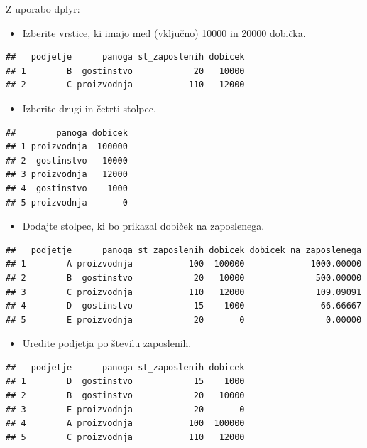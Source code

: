 \documentclass[
]{book}
\providecommand{\tightlist}{%
  \setlength{\itemsep}{0pt}\setlength{\parskip}{0pt}}
\begin{document}
Z uporabo dplyr:

\begin{itemize}
\tightlist
\item
  Izberite vrstice, ki imajo med (vključno) 10000 in 20000 dobička.
\end{itemize}

\begin{verbatim}
##   podjetje      panoga st_zaposlenih dobicek
## 1        B  gostinstvo            20   10000
## 2        C proizvodnja           110   12000
\end{verbatim}

\begin{itemize}
\tightlist
\item
  Izberite drugi in četrti stolpec.
\end{itemize}

\begin{verbatim}
##        panoga dobicek
## 1 proizvodnja  100000
## 2  gostinstvo   10000
## 3 proizvodnja   12000
## 4  gostinstvo    1000
## 5 proizvodnja       0
\end{verbatim}

\begin{itemize}
\tightlist
\item
  Dodajte stolpec, ki bo prikazal dobiček na zaposlenega.
\end{itemize}

\begin{verbatim}
##   podjetje      panoga st_zaposlenih dobicek dobicek_na_zaposlenega
## 1        A proizvodnja           100  100000             1000.00000
## 2        B  gostinstvo            20   10000              500.00000
## 3        C proizvodnja           110   12000              109.09091
## 4        D  gostinstvo            15    1000               66.66667
## 5        E proizvodnja            20       0                0.00000
\end{verbatim}

\begin{itemize}
\tightlist
\item
  Uredite podjetja po številu zaposlenih.
\end{itemize}

\begin{verbatim}
##   podjetje      panoga st_zaposlenih dobicek
## 1        D  gostinstvo            15    1000
## 2        B  gostinstvo            20   10000
## 3        E proizvodnja            20       0
## 4        A proizvodnja           100  100000
## 5        C proizvodnja           110   12000
\end{verbatim}
\end{document}
